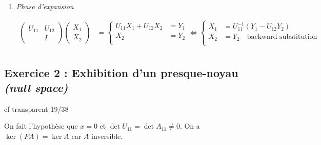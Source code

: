 \documentclass{article}
\begin{document}
\begin{enumerate}
\begin{enumerate}
        \item \emph{Phase d'expansion} 

            \begin{align*}
                
            \begin{pmatrix} U_{11} & U_{12} \\ & I \end{pmatrix} \begin{pmatrix} X_1 \\ X_2 \end{pmatrix} &= \begin{cases}
                U_{11}X_1 + U_{12}X_2 &= Y_1 \\
                X_2 &= Y_2 \\
            \end{cases} \iff \begin{cases}
                X_1 &= U_{11}^{-1} (Y_1 - U_{12} Y_2) \\
                X_2 &= Y_2 \quad\text{backward substitution} \\
            \end{cases} \\
            \end{align*}
    \end{enumerate}


\end{enumerate}


\subsection{Exercice 2 : Exhibition d'un presque-noyau \emph{(null space)} }

cf transparent 19/38

On fait l'hypothèse que $x=0$ et $\det U_{11} = \det A_{11} \neq 0$. On a $\ker(PA) = \ker A$ car  $A$ inversible.
\end{document}
